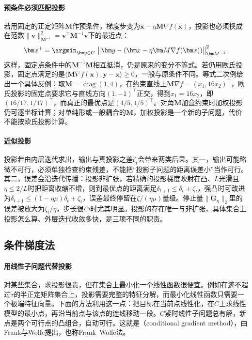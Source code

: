 \paragraph{预条件必须匹配投影}
若用固定的正定矩阵$\bm M$作预条件，梯度步变为$\bm x-\eta\bm M\nabla f(\bm x)$，投影也必须换成在范数$\lVert\bm v\rVert_{\bm M^{-1}}^2=\bm v^\top\bm M^{-1}\bm v$下的最近点：
\[
  \bm x^{+}=\argmin_{\bm y\in C}\ \bigl\lVert\bm y-(\bm x-\eta\bm M\nabla f(\bm x))\bigr\rVert_{\bm M^{-1}}^2.
\]
这样，固定点条件中的$\bm M^{-1}\bm M$相互抵消，仍是原来的变分不等式。若仍用欧氏投影，固定点满足的是$\langle\bm M\nabla f(\bm x),\bm y-\bm x\rangle\geq0$，一般与原条件不同。等式二次例给出一个具体反例：取$\bm M=\operatorname{diag}(1,4)$，在约束直线上$\bm M\nabla f=(x_1,16x_2)^\top$，欧氏投影的固定点要求它与直线方向$(1,-1)^\top$正交，得到$x_1=16x_2$，即$(16/17,1/17)^\top$，而真正的最优点是$(4/5,1/5)^\top$。对角$\bm M$加盒约束时加权投影仍可逐坐标计算；对单纯形或一般耦合的$\bm M$，加权投影是一个新的子问题，代价不能按欧氏投影计算。

\paragraph{近似投影}
投影若由内层迭代求出，输出与真投影之差$\zeta_t$会带来两类后果。其一，输出可能略微不可行，必须单独检查约束残差，不能把“投影子问题的距离误差小”当作可行。其二，误差会沿迭代传播：投影非扩张，若精确的投影梯度映射在凸、$L$光滑且$\eta\leq2/L$时把距离收缩不增，则到最优点的距离满足$\delta_{t+1}\leq\delta_t+\zeta_t$，强凸时可改进为$\delta_{t+1}\leq(1-\eta\mu)\delta_t+\zeta_t$，误差最终停留在$\zeta/(\eta\mu)$量级。停止量$\lVert\bm G_\eta\rVert_2$里的误差被放大为$\zeta_t/\eta$，步长很小时尤其明显。投影的存在唯一与非扩张、具体集合上投影怎么算、外层迭代收敛多快，是三项不同的职责。

\subsection{条件梯度法}
\label{sec:opt-con-frank-wolfe}

\paragraph{用线性子问题代替投影}
对某些集合，求投影很贵，但在集合上最小化一个线性函数很便宜。例如在迹不超过$\tau$的半正定矩阵集合上，投影需要完整的特征分解，而最小化线性函数只需要一个极端特征向量。下面的方法利用这一点：把目标在当前点线性化，在$C$上求线性模型的最小点，再沿当前点与该点的连线移动一段。$C$紧时线性子问题总有解，新点是两个可行点的凸组合，自动可行。这就是（conditional gradient method），由Frank与Wolfe提出，也称Frank--Wolfe法。

